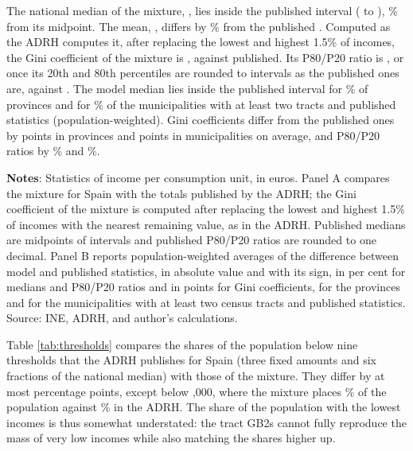The national median of the mixture, \texteuro\MixNatMedian{}, lies inside the published interval (\texteuro\AdrhNatMedianLo{} to \texteuro\AdrhNatMedianHi{}), \MixNatMedianErr{}\% from its midpoint. The mean, \texteuro\MixNatMean{}, differs by \MixNatMeanErr{}\% from the published \texteuro\AdrhNatMean{}. Computed as the ADRH computes it, after replacing the lowest and highest 1.5\% of incomes, the Gini coefficient of the mixture is \MixNatGini{}, against \AdrhNatGini{} published. Its P80/P20 ratio is \MixNatPEightyTwenty{}, or \MixNatPEightyTwentyBinned{} once its 20th and 80th percentiles are rounded to  intervals as the published ones are, against \AdrhNatPEightyTwenty{}\MixNatPEightyTwentyEdge{}. The model median lies inside the published interval for \ProvMedInBinPct{}\% of provinces and for \MunMedInBinPct{}\% of the \MunValN{} municipalities with at least two tracts and published statistics (population-weighted). Gini coefficients differ from the published ones by \ProvGiniAbsErr{} points in provinces and \MunGiniAbsErr{} points in municipalities on average, and P80/P20 ratios by \ProvPAbsErr{}\% and \MunPAbsErr{}\%.

\begin{table}[H]
\centering
\begin{threeparttable}
\onehalfspacing
\caption{Model and published statistics}\label{tab:aggregate}
\footnotesize

\begin{tablenotes}
\scriptsize
\textbf{Notes}: Statistics of income per consumption unit, in \BaseYear{} euros. Panel A compares the mixture for Spain with the totals published by the ADRH; the Gini coefficient of the mixture is computed after replacing the lowest and highest 1.5\% of incomes with the nearest remaining value, as in the ADRH. Published medians are midpoints of  intervals and published P80/P20 ratios are rounded to one decimal. Panel B reports population-weighted averages of the difference between model and published statistics, in absolute value and with its sign, in per cent for medians and P80/P20 ratios and in points for Gini coefficients, for the provinces and for the municipalities with at least two census tracts and published statistics. Source: INE, ADRH, and author's calculations.
\end{tablenotes}
\end{threeparttable}
\end{table}

Table \ref{tab:thresholds} compares the shares of the population below nine thresholds that the ADRH publishes for Spain (three fixed amounts and six fractions of the national median) with those of the mixture. They differ by at most \ThrOtherMaxDiff{} percentage points, except below ,000, where the mixture places \ThrFiveKModel{}\% of the population against \ThrFiveKObs{}\% in the ADRH. The share of the population with the lowest incomes is thus somewhat understated: the tract GB2s cannot fully reproduce the mass of very low incomes while also matching the shares higher up.


